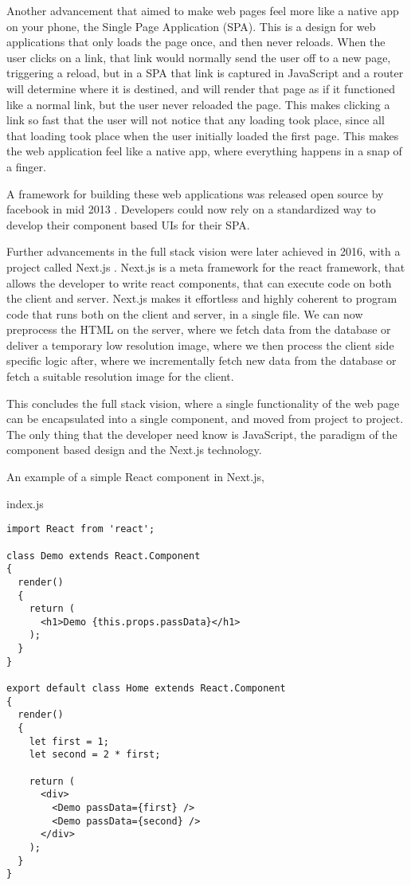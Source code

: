 \documentclass[a4paper,12pt,twoside,openright,titlepage]{book}
\begin{document}
Another advancement that aimed to make web pages feel more like a native app on your phone, the Single Page Application (SPA). This is a design for web applications that only loads the page once, and then never reloads. When the user clicks on a link, that link would normally send the user off to a new page, triggering a reload, but in a SPA that link is captured in JavaScript and a router will determine where it is destined, and will render that page as if it functioned like a normal link, but the user never reloaded the page. This makes clicking a link so fast that the user will not notice that any loading took place, since all that loading took place when the user initially loaded the first page.
This makes the web application feel like a native app, where everything happens in a snap of a finger.

A framework for building these web applications was released open source by facebook in mid 2013 \cite{react_release}.
Developers could now rely on a standardized way to develop their component based UIs for their SPA.

Further advancements in the full stack vision were later achieved in 2016, with a project called Next.js \cite{nextjs_release}.
Next.js is a meta framework for the react framework, that allows the developer to write react components, that can execute code on both the client and server. Next.js makes it effortless and highly coherent to program code that runs both on the client and server, in a single file. We can now preprocess the HTML on the server, where we fetch data from the database or deliver a temporary low resolution image, where we then process the client side specific logic after, where we incrementally fetch new data from the database or fetch a suitable resolution image for the client.

This concludes the full stack vision, where a single functionality of the web page can be encapsulated into a single component, and moved from project to project. The only thing that the developer need know is JavaScript, the paradigm of the component based design and the Next.js technology.

\bigskip

An example of a simple React component in Next.js,

\bigskip

index.js

\begin{verbatim}
import React from 'react';

class Demo extends React.Component
{
  render()
  {
    return (
      <h1>Demo {this.props.passData}</h1>
    );
  }
}

export default class Home extends React.Component
{
  render()
  {
    let first = 1;
    let second = 2 * first;

    return (
      <div>
        <Demo passData={first} />
        <Demo passData={second} />
      </div>
    );
  }
}
\end{verbatim}
\end{document}
